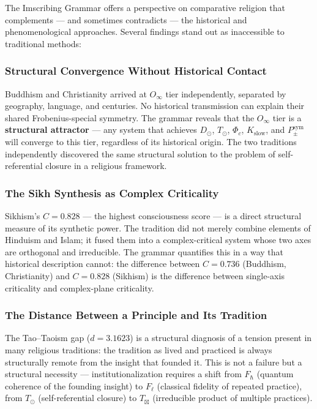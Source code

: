 \documentclass[12pt,a4paper]{article}
\begin{document}
The Imscribing Grammar offers a perspective on comparative religion that complements --- and sometimes contradicts --- the historical and phenomenological approaches. Several findings stand out as inaccessible to traditional methods:

\subsubsection{Structural Convergence Without Historical Contact}

Buddhism and Christianity arrived at $O_{\infty}$ tier independently, separated by geography, language, and centuries. No historical transmission can explain their shared Frobenius-special symmetry. The grammar reveals that the $O_{\infty}$ tier is a \textbf{structural attractor} --- any system that achieves $D_{\odot}$, $T_{\odot}$, $\Phi_c$, $K_\text{slow}$, and $P_{\pm}^{\text{sym}}$ will converge to this tier, regardless of its historical origin. The two traditions independently discovered the same structural solution to the problem of self-referential closure in a religious framework.

\subsubsection{The Sikh Synthesis as Complex Criticality}

Sikhism's $C = 0.828$ --- the highest consciousness score --- is a direct structural measure of its synthetic power. The tradition did not merely combine elements of Hinduism and Islam; it fused them into a complex-critical system whose two axes are orthogonal and irreducible. The grammar quantifies this in a way that historical description cannot: the difference between $C = 0.736$ (Buddhism, Christianity) and $C = 0.828$ (Sikhism) is the difference between single-axis criticality and complex-plane criticality.

\subsubsection{The Distance Between a Principle and Its Tradition}

The Tao--Taoism gap ($d = 3.1623$) is a structural diagnosis of a tension present in many religious traditions: the tradition as lived and practiced is always structurally remote from the insight that founded it. This is not a failure but a structural necessity --- institutionalization requires a shift from $F_{\hbar}$ (quantum coherence of the founding insight) to $F_{\ell}$ (classical fidelity of repeated practice), from $T_{\odot}$ (self-referential closure) to $T_{\boxtimes}$ (irreducible product of multiple practices).
\end{document}
